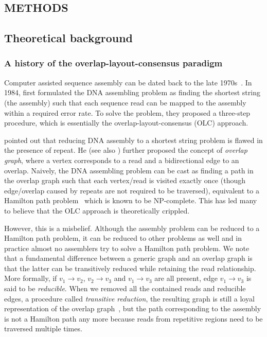 \documentclass{bioinfo}
\begin{document}
\begin{methods}
\section{METHODS}
\subsection{Theoretical background}
\subsubsection{A history of the overlap-layout-consensus paradigm}
Computer assisted sequence assembly can be dated back to the late
1970s~\citep{Staden:1979dq,Gingeras:1979cr}. 
In 1984, \citeauthor{Peltola:1984qf} first formulated the DNA assembling
problem as finding the shortest string (the assembly) such that each sequence
read can be mapped to the assembly within a required error rate.
To solve the problem, they proposed a three-step procedure, which is
essentially the overlap-layout-consensus (OLC) approach.

\citet{Myers:1995nx} pointed out that reducing DNA assembly to a shortest
string problem is flawed in the presence of repeat. He (see also
\citealt{DBLP:journals/algorithmica/KececiogluM95}) further proposed the
concept of \emph{overlap graph}, where a vertex corresponds to a read and a
bidirectional edge to an overlap. Naively, the DNA assembling problem can be
cast as finding a path in the overlap graph such that each vertex/read is
visited exactly once (though edge/overlap caused by repeats are not required to
be traversed), equivalent to a Hamilton path
problem~\citep{Compeau:2011fk,Li:2011zr} which is known to be NP-complete. This
has led many to believe that the OLC approach is theoretically crippled.

However, this is a misbelief. Although the assembly problem can be reduced to a
Hamilton path problem, it can be reduced to other problems as well and in
practice almost no assemblers try to solve a Hamilton path problem.  We note
that a fundamental difference between a generic graph and an overlap graph is
that the latter can be transitively reduced while retaining the read
relationship. More formally, if $v_1\to v_2$, $v_2\to v_3$ and $v_1\to v_3$ are
all present, edge $v_1\to v_3$ is said to be \emph{reducible}. When we removed
all the contained reads and reducible edges, a procedure called
\emph{transitive reduction}, the resulting graph is still a loyal
representation of the overlap graph~\citep{Myers:1995nx}, but the path
corresponding to the assembly is not a Hamilton path any more because reads
from repetitive regions need to be traversed multiple times.


\end{methods}
\end{document}
